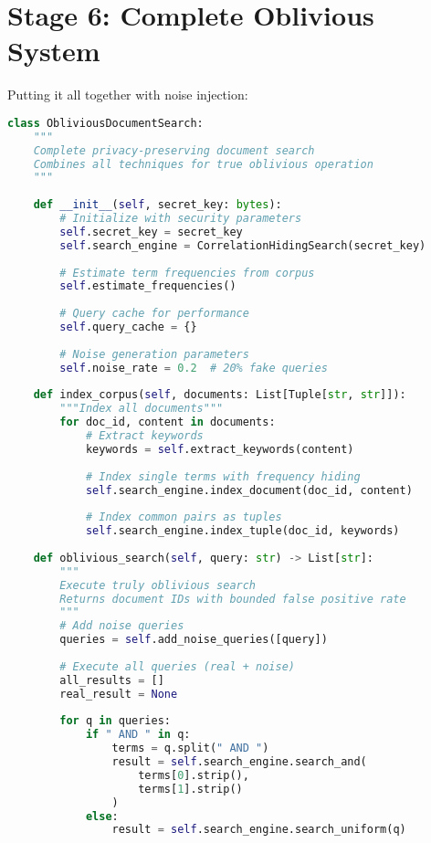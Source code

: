 \section{Stage 6: Complete Oblivious System}

Putting it all together with noise injection:

\begin{lstlisting}[language=Python, caption={Complete oblivious document search}]
class ObliviousDocumentSearch:
    """
    Complete privacy-preserving document search
    Combines all techniques for true oblivious operation
    """
    
    def __init__(self, secret_key: bytes):
        # Initialize with security parameters
        self.secret_key = secret_key
        self.search_engine = CorrelationHidingSearch(secret_key)
        
        # Estimate term frequencies from corpus
        self.estimate_frequencies()
        
        # Query cache for performance
        self.query_cache = {}
        
        # Noise generation parameters
        self.noise_rate = 0.2  # 20% fake queries
        
    def index_corpus(self, documents: List[Tuple[str, str]]):
        """Index all documents"""
        for doc_id, content in documents:
            # Extract keywords
            keywords = self.extract_keywords(content)
            
            # Index single terms with frequency hiding
            self.search_engine.index_document(doc_id, content)
            
            # Index common pairs as tuples
            self.search_engine.index_tuple(doc_id, keywords)
    
    def oblivious_search(self, query: str) -> List[str]:
        """
        Execute truly oblivious search
        Returns document IDs with bounded false positive rate
        """
        # Add noise queries
        queries = self.add_noise_queries([query])
        
        # Execute all queries (real + noise)
        all_results = []
        real_result = None
        
        for q in queries:
            if " AND " in q:
                terms = q.split(" AND ")
                result = self.search_engine.search_and(
                    terms[0].strip(), 
                    terms[1].strip()
                )
            else:
                result = self.search_engine.search_uniform(q)
            

\end{lstlisting}
